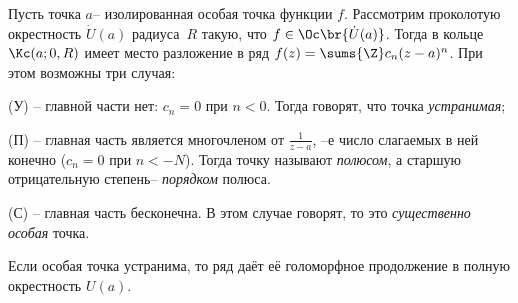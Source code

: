 \documentclass[a4paper]{article}
\begin{document}
\begin{df}
Пусть точка $a$-- изолированная особая точка функции $f$. Рассмотрим проколотую
окрестность $\dot{U}(a)$ радиуса~$R$ такую, что $f \in \Oc\br{\dot{U}(a)}$. Тогда в кольце $\Kc(a;0,R)$
имеет место разложение в ряд $f(z)=\sums{\Z}c_n(z-a)^n$. При этом возможны три случая:

\begin{items}{-2}
\item[(У)]-- главной части нет: $c_n=0$ при $n<0$. Тогда говорят, что точка \emph{устранимая};
\item[(П)]-- главная часть является многочленом от $\frac{1}{z-a}$, --е число слагаемых в ней
конечно ($c_n=0$ при $n<-N$). Тогда точку называют \emph{полюсом}, а старшую отрицательную
степень-- \emph{порядком} полюса.
\item[(С)]-- главная часть бесконечна. В этом случае говорят, то это \emph{существенно особая} точка.
\end{items}
\end{df}

Если особая точка устранима, то ряд даёт её голоморфное продолжение в полную окрестность $U(a)$.
\end{document}
